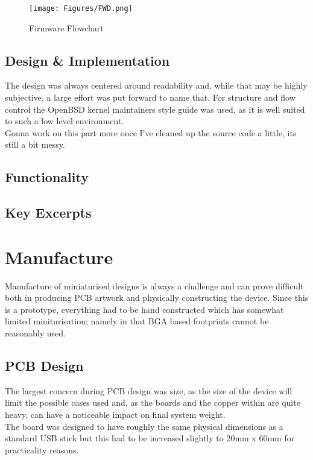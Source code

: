 \documentclass[12pt,openany,a4paper]{book}
\begin{document}
		\begin{figure}[H]
			\centering
			\texttt{[image: Figures/FWD.png]}
			\caption{Firmware Flowchart}
			\label{fig:FWD}
		\end{figure}		

		\newpage
		\subsection{Design \& Implementation} %
		The design was always centered around readability and, while that may be highly subjective, a large effort was put forward to name that. For structure and flow control the OpenBSD kernel maintainers style guide \cite{BSDstyle} was used, as it is well suited to such a low level environment. \\
		
		Gonna work on this part more once I've cleaned up the source code a little, its still a bit messy.
		\subsection{Functionality}
		\subsection{Key Excerpts}
	\newpage
	\section{Manufacture}
		Manufacture of miniaturised designs is always a challenge and can prove difficult both in producing PCB artwork and physically constructing the device. Since this is a prototype, everything had to be hand constructed which has somewhat limited miniturisation; namely in that BGA based footprints cannot be reasonably used. 
		
		\subsection{PCB Design}
			The largest concern during PCB design was size, as the size of the device will limit the possible cases used and, as the boards and the copper within are quite heavy, can have a noticeable impact on final system weight. \\
			
			The board was designed to have roughly the same physical dimensions as a standard USB stick but this had to be increased slightly to 20mm x 60mm for practicality reasons. \\
			
\end{document}
